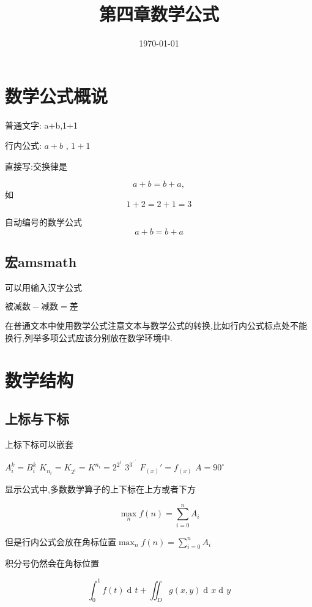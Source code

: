 \documentclass[UTF8]{ctexart}
\title{第四章数学公式}
\date{\today}
\DeclareMathOperator\dif{d\!}
\begin{document}
  \maketitle
  \section{数学公式概说}
    普通文字: a+b,1+1

    行内公式: $a+b$ , $1+1$

    直接写:交换律是

    \[ a+b = b+a, \]
    如
    \[
      1+2=2+1=3
    \]

    自动编号的数学公式
    \begin{equation}
      a+b = b+a\label{eq:communtative}
    \end{equation}

    \subsection{宏amsmath}
      可以用输入汉字公式

      $\text{被减数} - \text{减数} = \text{差}$

      在普通文本中使用数学公式注意文本与数学公式的转换,比如行内公式标点处不能换行,列举多项公式应该分别放在数学环境中.
  \section{数学结构}
    \subsection{上标与下标}
      上标下标可以嵌套

        $A_i^k = B^k_i$\qquad
        $K_{n_i} = K_{2^i} = K^{n_i} = 2^{2^i}$\qquad
        $3^{3^{\cdot^{\cdot^{\cdot^3}}}}$
        $F_{(x)}' = f_{(x)}$
        $ A = 90^\circ$

      显示公式中,多数数学算子的上下标在上方或者下方

        \[
          \max_n f(n) = \sum_{i=0}^n A_i
        \]

      但是行内公式会放在角标位置$\max_n f(n) = \sum_{i=0}^n A_i$

      积分号仍然会在角标位置
        \begin{codeshow}
          \[ \int_0^1 f(t) \dif t + \iint_D g(x,y) \dif x \dif y\]
        \end{codeshow}
\end{document}
